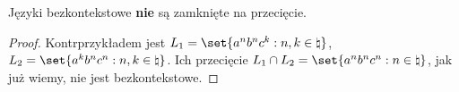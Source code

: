 \begin{theorem}
    Języki bezkontekstowe \textbf{nie} są zamknięte na przecięcie.
\end{theorem}
\begin{proof}
    Kontrprzykładem jest \( L_1 = \set{a^nb^nc^k : n, k \in \natural} \), \( L_2 = \set{a^kb^nc^n : n, k \in \natural} \).
    Ich przecięcie \( L_1 \cap L_2 = \set{a^nb^nc^n : n \in \natural} \), jak już wiemy, nie jest bezkontekstowe.
\end{proof}